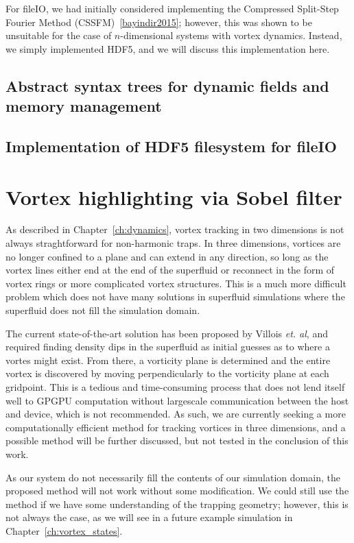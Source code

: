 For fileIO, we had initially considered implementing the Compressed Split-Step Fourier Method (CSSFM)~\ref{bayindir2015}; however, this was shown to be unsuitable for the case of $n$-dimensional systems with vortex dynamics.
Instead, we simply implemented HDF5, and we will discuss this implementation here.

\subsection{Abstract syntax trees for dynamic fields and memory management}

\subsection{Implementation of HDF5 filesystem for fileIO}

\section{Vortex highlighting via Sobel filter}

As described in Chapter~\ref{ch:dynamics}, vortex tracking in two dimensions is not always straghtforward for non-harmonic traps.
In three dimensions, vortices are no longer confined to a plane and can extend in any direction, so long as the vortex lines either end at the end of the superfluid or reconnect in the form of vortex rings or more complicated vortex structures.
This is a much more difficult problem which does not have many solutions in superfluid simulations where the superfluid does not fill the simulation domain.

The current state-of-the-art solution has been proposed by Villois \textit{et. al}, and required finding density dips in the superfluid as initial guesses as to where a vortes might exist.
From there, a vorticity plane is determined and the entire vortex is discovered by moving perpendicularly to the vorticity plane at each gridpoint.
This is a tedious and time-consuming process that does not lend itself well to GPGPU computation without largescale communication between the host and device, which is not recommended.
As such, we are currently seeking a more computationally efficient method for tracking vortices in three dimensions, and a possible method will be further discussed, but not tested in the conclusion of this work.

As our system do not necessarily fill the contents of our simulation domain, the proposed method will not work without some modification.
We could still use the method if we have some understanding of the trapping geometry; however, this is not always the case, as we will see in a future example simulation in Chapter~\ref{ch:vortex_states}.

